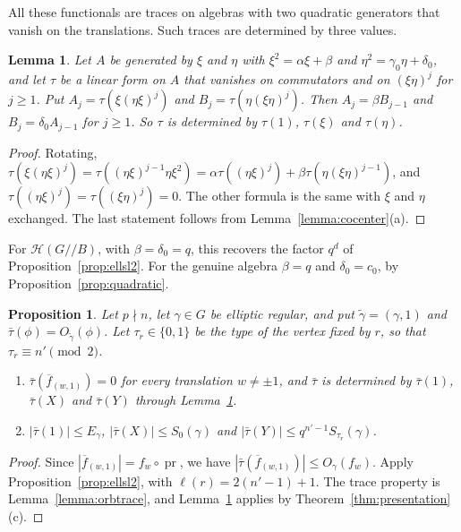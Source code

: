 \documentclass[12pt,letterpaper]{amsart}
\numberwithin{equation}{section}
\newtheorem{proposition}[theorem]{Proposition}
\newtheorem{lemma}[theorem]{Lemma}
\theoremstyle{definition}
\theoremstyle{remark}
\DeclareMathOperator{\pr}{pr}
\newcommand{\cH}{\mathcal{H}}
\newcommand{\fbar}{\overline{f}}
\begin{document}
All these functionals are traces on algebras with two quadratic
generators that vanish on the translations. Such traces are determined
by three values.

\begin{lemma}
\label{lemma:ellrec}
Let $A$ be generated by $\xi$ and $\eta$ with $\xi^2=\alpha\xi+\beta$
and $\eta^2=\gamma_0\eta+\delta_0$, and let $\tau$ be a linear form on
$A$ that vanishes on commutators and on $(\xi\eta)^j$ for $j\geq1$. Put
$A_j=\tau(\xi(\eta\xi)^j)$ and $B_j=\tau(\eta(\xi\eta)^j)$. Then
$A_j=\beta B_{j-1}$ and $B_j=\delta_0A_{j-1}$ for $j\geq1$. So $\tau$ is
determined by $\tau(1)$, $\tau(\xi)$ and $\tau(\eta)$.
\end{lemma}

\begin{proof}
Rotating, $\tau(\xi(\eta\xi)^j)=\tau((\eta\xi)^{j-1}\eta\xi^2)
=\alpha\tau((\eta\xi)^j)+\beta\tau(\eta(\xi\eta)^{j-1})$, and
$\tau((\eta\xi)^j)=\tau((\xi\eta)^j)=0$. The other formula is the same
with $\xi$ and $\eta$ exchanged. The last statement follows from
Lemma~\ref{lemma:cocenter}(a).
\end{proof}

For $\cH(G/\!/B)$, with $\beta=\delta_0=q$, this recovers the factor
$q^d$ of Proposition~\ref{prop:ellsl2}. For the genuine algebra
$\beta=q$ and $\delta_0=c_0$, by Proposition~\ref{prop:quadratic}.

\begin{proposition}
\label{prop:ellgen}
Let $p\nmid n$, let $\gamma\in G$ be elliptic regular, and put
$\tilde\gamma=(\gamma,1)$ and $\bar\tau(\phi)=O_{\tilde\gamma}(\phi)$.
Let $\tau_r\in\{0,1\}$ be the type of the vertex fixed by $r$, so that
$\tau_r\equiv n'\pmod2$.
\begin{enumerate}[leftmargin=2em,label=(\alph*)]
\item $\bar\tau(\fbar_{(w,1)})=0$ for every translation $w\neq\pm1$, and
$\bar\tau$ is determined by $\bar\tau(1)$, $\bar\tau(X)$ and
$\bar\tau(Y)$ through Lemma~\ref{lemma:ellrec}.
\item $|\bar\tau(1)|\leq E_\gamma$, $|\bar\tau(X)|\leq S_0(\gamma)$ and
$|\bar\tau(Y)|\leq q^{n'-1}S_{\tau_r}(\gamma)$.
\end{enumerate}
\end{proposition}

\begin{proof}
Since $|\fbar_{(w,1)}|=f_w\circ\pr$, we have
$|\bar\tau(\fbar_{(w,1)})|\leq O_\gamma(f_w)$. Apply
Proposition~\ref{prop:ellsl2}, with $\ell(r)=2(n'-1)+1$. The trace
property is Lemma~\ref{lemma:orbtrace}, and Lemma~\ref{lemma:ellrec}
applies by Theorem~\ref{thm:presentation}(c).
\end{proof}
\end{document}
